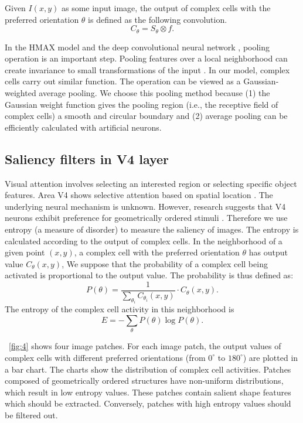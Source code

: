 \documentclass[twocolumn]{article}
\begin{document}
Given $I(x,y)$ as some input image, the output of complex cells with the preferred orientation $\theta$ is defined as the following convolution.
\begin{equation}
C_{\theta}=S_{\theta}\otimes f.
\label{equ:complex}
\end{equation}

In the HMAX model \cite{riesenhuber1999} and the deep convolutional neural network \cite{krizhevsky2012}, pooling operation is an important step.
Pooling features over a local neighborhood can create invariance to small transformations of the input \cite{boureau2010}.
In our model, complex cells carry out similar function.
The operation can be viewed as a Gaussian-weighted average pooling.
We choose this pooling method because 
(1) the Gaussian weight function gives the pooling region (i.e., the receptive field of complex cells) a smooth and circular boundary
and (2) average pooling can be efficiently calculated with artificial neurons.  

\subsection{Saliency filters in V4 layer}

Visual attention involves selecting an interested region or selecting specific object features.
Area V4 shows selective attention based on spatial location \cite{desimone1995}.
The underlying neural mechanism is unknown.
However, research suggests that V4 neurons exhibit preference for geometrically ordered stimuli \cite{sasaki2005}.
Therefore we use entropy (a measure of disorder) to measure the saliency of images.
The entropy is calculated according to the output of complex cells.
In the neighborhood of a given point $(x,y)$,
a complex cell with the preferred orientation $\theta$ has output value $C_{\theta}(x,y)$,
We suppose that the probability of a complex cell being activated is proportional to the output value.
The probability is thus defined as:
\begin{equation}
P(\theta)=\frac{1}{\sum_{\theta_i} C_{\theta_i}(x,y)}\cdot C_{\theta}(x,y).
\end{equation}
The entropy of the complex cell activity in this neighborhood is 
\begin{equation}
E=-\sum_{\theta} P(\theta) \log P(\theta).
\end{equation}

\figurename~\ref{fig:4} shows four image patches.
For each image patch, the output values of complex cells with different preferred orientations (from $0^\circ$ to $180^\circ$) are plotted in a bar chart.
The charts show the distribution of complex cell activities.
Patches composed of geometrically ordered structures have non-uniform distributions, which result in low entropy values.
These patches contain salient shape features which should be extracted.
Conversely, patches with high entropy values should be filtered out.
\end{document}
